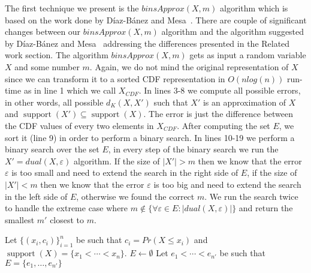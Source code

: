 \documentclass[letterpaper]{article} %
\DeclareMathOperator{\supp}{support}
\DeclareMathOperator{\support}{support}
\begin{document}
The first technique we present is the $binsApprox(X,m)$ algorithm which is based on the work done by D{\'i}az-B{\'a}nez and Mesa~\cite{diaz2001fitting}. There are couple of significant changes between our $binsApprox(X,m)$ algorithm and the algorithm suggested by D{\'i}az-B{\'a}nez and Mesa~ addressing the differences presented in the Related work section. The algorithm $binsApprox(X,m)$ gets as input a random variable $X$ and some number $m$. Again, we do not mind the original representation of $X$ since we can transform it to a sorted CDF representation in $O(nlog(n))$ run-time as in line 1 which we call $X_{CDF}$. In lines 3-8 we compute all possible errors, in other words, all possible $d_{K}(X,X')$ such that $X'$ is an approximation of $X$ and $\support(X') \subseteq \support(X)$. The error is just the difference between the CDF values of every two elements in $X_{CDF}$. After computing the set $E$, we sort it (line 9) in order to perform a binary search. In lines 10-19 we perform a binary search over the set $E$, in every step of the binary search we run the $X' = dual(X,\varepsilon)$ algorithm. If the size of $|X'|>m$ then we know that the error $\varepsilon$ is too small and need to extend the search in the right side of $E$, if the size of $|X'|<m$ then we know that the error $\varepsilon$ is too big and need to extend the search in the left side of $E$, otherwise we found the correct $m$. We run the search twice to handle the extreme case where $m \notin \{\forall \varepsilon\in E: |dual(X,\varepsilon)|\}$ and return the smallest $m'$ closest to $m$.
 

\begin{algorithm}
	\DontPrintSemicolon
	Let $\{(x_i, c_i)\}_{i=1}^n$ be such that $c_i=Pr(X \leq x_i)$ and $\supp(X)=\{x_1 < \cdots < x_n\}$.\;
    $E \gets \emptyset$\; 
    Let $e_1<\cdots<e_{n'}$ be such that $E=\{e_1,\dots,e_{n'}\}$ \;
    

	\caption{$binsApprox(X,m)$}   
	\label{alg:naive}
\end{algorithm}
\end{document}
